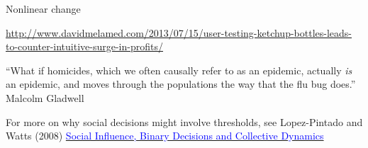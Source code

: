 \documentclass[aspectratio=169]{beamer}
\def\vf{\vfill}
\begin{document}
\begin{frame}

Nonlinear change

\begin{figure}
  \centering
  \hspace{0in}
  \hspace{0in}
\end{figure}

\vf
\tiny{\url{http://www.davidmelamed.com/2013/07/15/user-testing-ketchup-bottles-leads-to-counter-intuitive-surge-in-profits/}}


\end{frame}
\begin{frame}

``What if homicides, which we often causally refer to as an epidemic, actually \emph{is} an epidemic, and moves through the populations the way that the flu bug does.''
Malcolm Gladwell

\end{frame}
\begin{frame}

\setcounter{subfigure}{0}%
\begin{figure}
  \centering
  \hspace{0in}
\end{figure}

\vfill
\tiny{
For more on why social decisions might involve thresholds, see Lopez-Pintado and Watts (2008) \href{http://dx.doi.org/10.1177/1043463108096787}{\textcolor{blue}{Social Influence, Binary Decisions and Collective Dynamics}}}


\end{frame}
\end{document}
